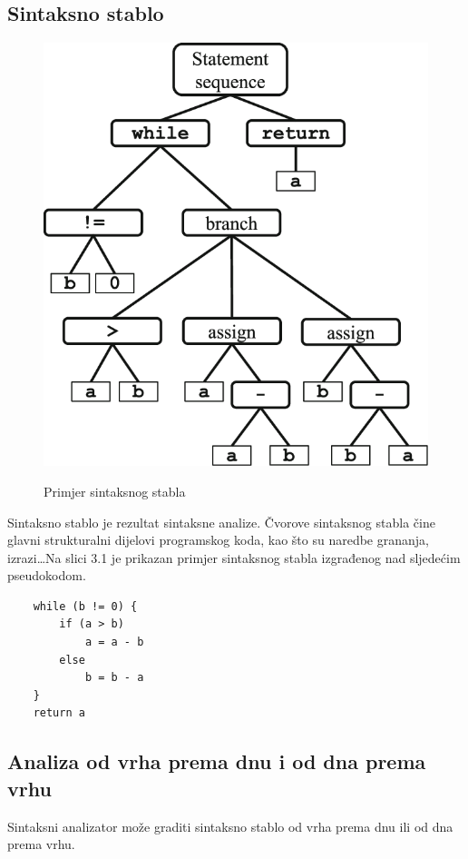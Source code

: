 \documentclass[times, utf8, zavrsni]{fer}
\begin{document}
\subsection{Sintaksno stablo}
\begin{figure}
    \includegraphics[scale=0.5]{800px-Abstract_syntax_tree_for_Euclidean_algorithm.svg.png}\\
    \caption{Primjer sintaksnog stabla \citep{slika}}
\end{figure}

Sintaksno stablo je rezultat sintaksne analize. Čvorove sintaksnog stabla čine glavni strukturalni dijelovi programskog koda, kao što su naredbe grananja,
izrazi\dots Na slici 3.1 je prikazan primjer sintaksnog stabla izgrađenog nad sljedećim pseudokodom.
\begin{verbatim}
    while (b != 0) {
        if (a > b)
            a = a - b
        else
            b = b - a
    }
    return a
\end{verbatim}

\pagebreak
\subsection{Analiza od vrha prema dnu i od dna prema vrhu}
Sintaksni analizator može graditi sintaksno stablo od vrha prema dnu ili od dna prema vrhu.
\end{document}
